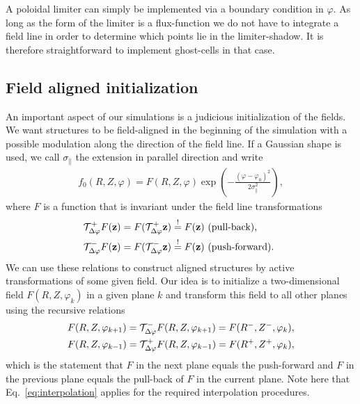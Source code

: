 A poloidal limiter can simply be implemented via a boundary condition in $\varphi$. 
As long as the form of the limiter is a flux-function we do not have to 
integrate a field line in order to determine which points lie in the
limiter-shadow. It is therefore straightforward to implement ghost-cells 
in that case. 

\subsection{Field aligned initialization} \label{sec:parallelc}

An important aspect of our simulations is a judicious initialization of the 
fields. We want structures to be field-aligned in the beginning of the simulation with
a possible modulation along the direction of the field line.
If a Gaussian shape is used, we call $\sigma_\parallel$ the extension in parallel
direction and write
\begin{align}
    f_0(R,Z,\varphi) = F(R,Z,\varphi) \exp\left( - \frac{(\varphi-\varphi_0)^2}{2\sigma_\parallel^2}\right),
    \label{eq:parallelInit}
\end{align}
where $F$ is a function that is invariant under the field line transformations
\begin{subequations}
\begin{align}
    \mathcal T^+_{\Delta\varphi} F({\mathbf{z}}) &= F( \mathcal T^+_{\Delta\varphi} {\mathbf{z}}) \overset{!}{=} F({\mathbf{z}}) \text{ (pull-back), } \\
    \mathcal T^-_{\Delta\varphi} F({\mathbf{z}}) &= F( \mathcal T^-_{\Delta\varphi} {\mathbf{z}}) \overset{!}{=} F({\mathbf{z}}) \text{ (push-forward). } 
\end{align}
\label{}
\end{subequations}
We can use these relations to construct aligned structures
by active transformations of some given field.
Our idea is to initialize a two-dimensional field $F(R,Z, \varphi_k)$ in a given plane $k$ and 
transform this field to all other planes using the recursive relations
\begin{subequations}
\begin{align}
    F( R, Z, \varphi_{k+1}) = \mathcal T^-_{\Delta\varphi} F( R, Z, \varphi_{k+1}) = F(R^-, Z^-, \varphi_k), \\
    F( R, Z, \varphi_{k-1}) = \mathcal T^+_{\Delta\varphi} F( R, Z, \varphi_{k-1}) = F(R^+, Z^+, \varphi_k),
\end{align}
    \label{eq:recursiveInit}
\end{subequations}
which is the statement that $F$ in the next plane equals the push-forward  
and $F$ in the previous plane equals the pull-back of $F$ in the current plane. 
Note here that Eq.~\eqref{eq:interpolation} applies for the required interpolation
procedures. 


